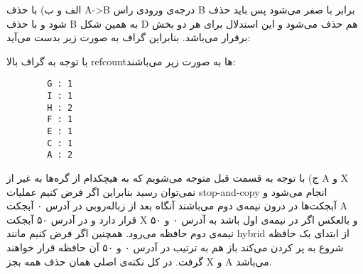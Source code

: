 الف و ب) با حذف A->B درجه‌ی ورودی راس B برابر با صفر می‌شود پس باید حذف شود و با حذف B به همین شکل D هم حذف می‌شود و این استدلال برای هر دو بخش برقرار می‌باشد. بنابراین گراف به صورت زیر بدست می‌آید:
\begin{latin}
	\begin{center}
	\end{center}
\end{latin}
با توجه به گراف بالا refcount‌ها به صورت زیر می‌باشند:
\begin{latin}
	\begin{verbatim}
		G : 1
		I : 1
		H : 2
		F : 1
		E : 1
		C : 1
		A : 2
	\end{verbatim}
\end{latin}
ج) با توجه به قسمت قبل متوجه می‌شویم که به هیچکدام از گره‌ها به غیر از A و X نمی‌توان رسید بنابراین اگر فرض کنیم عملیات stop-and-copy انجام می‌شود و آبجکت‌ها در درون نیمه‌ی دوم می‌باشند آنگاه بعد از زباله‌روبی در آدرس ۰ آبجکت A قرار دارد و در آدرس ۵۰ آبجکت X و بالعکس اگر در نیمه‌ی اول باشد به آدرس ۰ و ۵۰ نیمه‌ی دوم حافظه می‌رود. همچنین اگر فرض کنیم مانند hybrid از ابتدای یک حافظه شروع به پر کردن می‌کند باز هم به ترتیب در آدرس ۰ و ۵۰ آن حافظه قرار خواهند گرفت. در کل نکته‌ی اصلی همان حذف همه بجز X و A می‌باشد.

